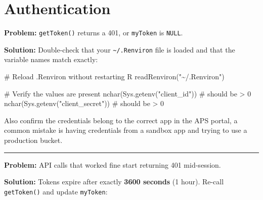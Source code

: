 \documentclass[
  11pt,
  letterpaper,
  DIV=11,
  numbers=noendperiod]{scrreprt}
\newenvironment{Shaded}{\begin{snugshade}}{\end{snugshade}}
\newcommand{\AttributeTok}[1]{\textcolor[rgb]{0.40,0.45,0.13}{#1}}
\newcommand{\CommentTok}[1]{\textcolor[rgb]{0.37,0.37,0.37}{#1}}
\newcommand{\FunctionTok}[1]{\textcolor[rgb]{0.28,0.35,0.67}{#1}}
\newcommand{\NormalTok}[1]{\textcolor[rgb]{0.00,0.23,0.31}{#1}}
\newcommand{\OtherTok}[1]{\textcolor[rgb]{0.00,0.23,0.31}{#1}}
\newcommand{\SpecialCharTok}[1]{\textcolor[rgb]{0.37,0.37,0.37}{#1}}
\newcommand{\StringTok}[1]{\textcolor[rgb]{0.13,0.47,0.30}{#1}}
\begin{document}
\section{Authentication}\label{authentication-3}

\textbf{Problem:} \texttt{getToken()} returns a 401, or \texttt{myToken}
is \texttt{NULL}.

\textbf{Solution:} Double-check that your
\texttt{\textasciitilde{}/.Renviron} file is loaded and that the
variable names match exactly:

\begin{Shaded}
\begin{Highlighting}[]
\CommentTok{\# Reload .Renviron without restarting R}
\FunctionTok{readRenviron}\NormalTok{(}\StringTok{"\textasciitilde{}/.Renviron"}\NormalTok{)}

\CommentTok{\# Verify the values are present}
\FunctionTok{nchar}\NormalTok{(}\FunctionTok{Sys.getenv}\NormalTok{(}\StringTok{"client\_id"}\NormalTok{))      }\CommentTok{\# should be \textgreater{} 0}
\FunctionTok{nchar}\NormalTok{(}\FunctionTok{Sys.getenv}\NormalTok{(}\StringTok{"client\_secret"}\NormalTok{))  }\CommentTok{\# should be \textgreater{} 0}
\end{Highlighting}
\end{Shaded}

Also confirm the credentials belong to the correct app in the APS
portal, a common mistake is having credentials from a sandbox app and
trying to use a production bucket.

\begin{center}\rule{0.5\linewidth}{0.5pt}\end{center}

\textbf{Problem:} API calls that worked fine start returning 401
mid-session.

\textbf{Solution:} Tokens expire after exactly \textbf{3600 seconds} (1
hour). Re-call \texttt{getToken()} and update \texttt{myToken}:

\begin{Shaded}
\end{Shaded}
\end{document}
